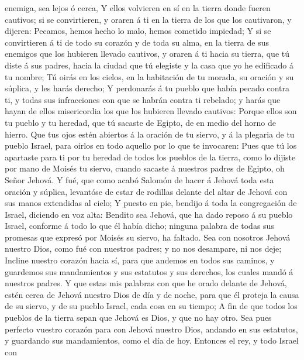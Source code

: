 enemiga, sea lejos ó cerca,  Y ellos volvieren en sí en
la tierra donde fueren cautivos; si se convirtieren, y oraren á ti en la
tierra de los que los cautivaron, y dijeren: Pecamos, hemos hecho lo
malo, hemos cometido impiedad;  Y si se convirtieren á ti
de todo su corazón y de toda su alma, en la tierra de sus enemigos que
los hubieren llevado cautivos, y oraren á ti hacia su tierra, que tú
diste á sus padres, hacia la ciudad que tú elegiste y la casa que yo he
edificado á tu nombre;  Tú oirás en los cielos, en la
habitación de tu morada, su oración y su súplica, y les harás derecho;
 Y perdonarás á tu pueblo que había pecado contra ti, y
todas sus infracciones con que se habrán contra ti rebelado; y harás que
hayan de ellos misericordia los que los hubieren llevado cautivos:
 Porque ellos son tu pueblo y tu heredad, que tú sacaste
de Egipto, de en medio del horno de hierro.  Que tus ojos
estén abiertos á la oración de tu siervo, y á la plegaria de tu pueblo
Israel, para oirlos en todo aquello por lo que te invocaren:
 Pues que tú los apartaste para ti por tu heredad de
todos los pueblos de la tierra, como lo dijiste por mano de Moisés tu
siervo, cuando sacaste á nuestros padres de Egipto, oh Señor Jehová.
 Y fué, que como acabó Salomón de hacer á Jehová toda
esta oración y súplica, levantóse de estar de rodillas delante del altar
de Jehová con sus manos extendidas al cielo;  Y puesto en
pie, bendijo á toda la congregación de Israel, diciendo en voz alta:
 Bendito sea Jehová, que ha dado reposo á su pueblo
Israel, conforme á todo lo que él había dicho; ninguna palabra de todas
sus promesas que expresó por Moisés su siervo, ha faltado.
 Sea con nosotros Jehová nuestro Dios, como fué con
nuestros padres; y no nos desampare, ni nos deje; 
Incline nuestro corazón hacia sí, para que andemos en todos sus caminos,
y guardemos sus mandamientos y sus estatutos y sus derechos, los cuales
mandó á nuestros padres.  Y que estas mis palabras con
que he orado delante de Jehová, estén cerca de Jehová nuestro Dios de
día y de noche, para que él proteja la causa de su siervo, y de su
pueblo Israel, cada cosa en su tiempo;  A fin de que
todos los pueblos de la tierra sepan que Jehová es Dios, y que no hay
otro.  Sea pues perfecto vuestro corazón para con Jehová
nuestro Dios, andando en sus estatutos, y guardando sus mandamientos,
como el día de hoy.  Entonces el rey, y todo Israel con
